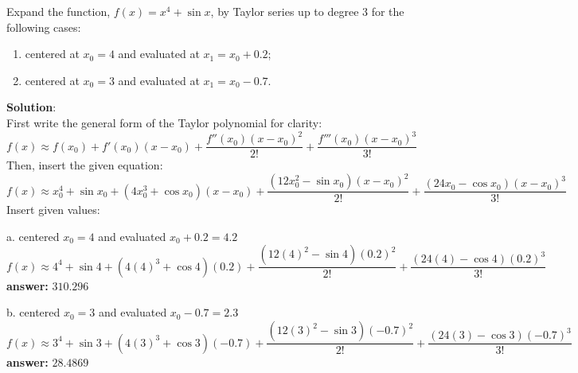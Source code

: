 \documentclass[12pt]{article}
\begin{document}
\begin{description}
    
    \fi
    \color{black}
    
\item[4. Taylor Series (15 pts)] Expand the function, $f (x) = x^4 + \sin{x}$, by Taylor series up to degree 3 for the following cases:
    \begin{enumerate}[label=\textbf{(\alph*)}]
	\item centered at $x_0 = 4$ and evaluated at $x_1 = x_0 + 0.2$;
	\item centered at $x_0 = 3$ and evaluated at $x_1 = x_0 - 0.7$.
    \end{enumerate}

    \color{red}
    \ifsolution
    {\bf Solution}:\\
    First write the general form of the Taylor polynomial for clarity:
    \begin{equation*}
        f(x) \approx f(x_0) + f'(x_0) (x - x_0)+ \dfrac{f'' (x_0) (x - x_0)^2}{2!}+ \dfrac{f''' (x_0) (x - x_0)^3}{3!}
    \end{equation*}
    Then, insert the given equation:
    \begin{equation*}
        f(x) \approx x_0^4+\sin{x_0} + (4x_0^3+\cos{x_0})(x-x_0)+ \dfrac{(12x_0^2-\sin{x_0})(x-x_0)^2}{2!}+ \dfrac{(24x_0-\cos{x_0} )(x-x_0)^3}{3!}
    \end{equation*}
    Insert given values:

    \item a. centered $x_0=4$ and evaluated $x_0 + 0.2 = 4.2$
    \begin{equation*}
        f(x) \approx 4^4+\sin{4} + (4(4)^3+\cos{4})(0.2)+ \dfrac{(12(4)^2-\sin{4})(0.2)^2}{2!}+ \dfrac{(24(4)-\cos{4})(0.2)^3}{3!}
    \end{equation*}
    \textbf{answer:} $310.296$

    \item b. centered $x_0=3$ and evaluated $x_0 - 0.7 =2.3$
    \begin{equation*}
        f(x) \approx 3^4+\sin{3} + (4(3)^3+\cos{3})(-0.7)+ \dfrac{(12(3)^2-\sin{3})(-0.7)^2}{2!}+ \dfrac{(24(3)-\cos{3})(-0.7)^3}{3!}
    \end{equation*}
    \textbf{answer:} $28.4869$
    \fi
    \color{black}


\end{description}
\end{document}

